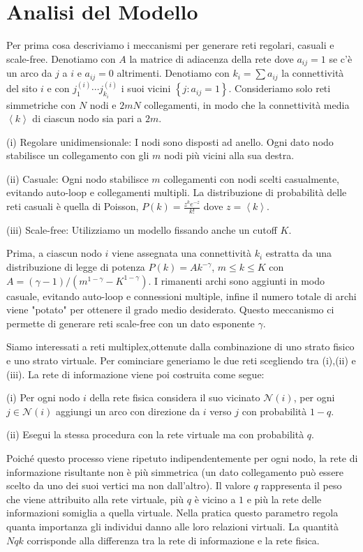 \section{Analisi del Modello}\label{sec:analisi-del-modello}

Per prima cosa descriviamo i meccanismi per generare reti regolari, casuali e scale-free.
Denotiamo con $A$ la matrice di adiacenza della rete dove $a_{ij} = 1$ se c'è un arco da
$j$ a $i$ e $a_{ij} = 0$ altrimenti.
Denotiamo con $k_i = \sum a_{ij}$ la connettività del sito $i$ e 
con $j^{(i)}_{1}\cdots j^{(i)}_{k_{i}}$ i suoi vicini $\left\{ j : a_{ij}=1 \right\}$. 
Consideriamo solo reti simmetriche con $N$ nodi e $2mN$ collegamenti, in modo che la connettività media 
$\left\langle k \right\rangle$ di ciascun nodo sia pari a $2m$.

(i) Regolare unidimensionale: I nodi sono disposti ad anello.
Ogni dato nodo stabilisce un collegamento con gli $m$ nodi più vicini alla sua destra.

(ii) Casuale: Ogni nodo stabilisce $m$ collegamenti con nodi scelti casualmente, evitando auto-loop e collegamenti
multipli.
La distribuzione di probabilità delle reti casuali è quella di Poisson, $P(k) = \frac{z^k e^{-z}}{k!}$ 
dove $z =\left\langle k \right\rangle$.

(iii) Scale-free: Utilizziamo un modello fissando anche un cutoff $K$.

Prima, a ciascun nodo $i$ viene assegnata una connettività $k_i$ estratta da una distribuzione 
di legge di potenza $P(k) = A k^{-\gamma}$, $m \leq k \leq K$ con $A=(\gamma -1)/(m^{1-\gamma} -K^{1-\gamma})$.
I rimanenti archi sono aggiunti in modo casuale, evitando auto-loop e connessioni multiple, infine
il numero totale di archi viene "potato" per ottenere il grado medio desiderato.
Questo meccanismo ci permette di generare reti scale-free con un dato esponente $\gamma$.

Siamo interessati a reti multiplex,ottenute dalla combinazione di uno strato fisico e uno strato virtuale.
Per cominciare generiamo le due reti scegliendo tra (i),(ii) e (iii). 
La rete di informazione viene poi costruita come segue:

(i) Per ogni nodo $i$ della rete fisica considera il suo vicinato $\mathcal{N}(i)$, per ogni $j\in \mathcal{N}(i)$
aggiungi un arco con direzione da $i$ verso $j$ con probabilità $1-q$.

(ii) Esegui la stessa procedura con la rete virtuale ma con probabilità $q$.

Poiché questo processo viene ripetuto indipendentemente per ogni nodo, la rete di informazione risultante 
non è più simmetrica (un dato collegamento può essere scelto da uno dei suoi vertici ma non dall'altro). 
Il valore $q$ rappresenta il peso che viene attribuito alla rete virtuale, più $q$ è vicino a $1$ e più la 
rete delle informazioni somiglia a quella virtuale. Nella pratica questo parametro regola quanta 
importanza gli individui danno alle loro relazioni virtuali.
La quantità $Nqk$ corrisponde alla differenza tra la rete di informazione e la rete fisica.

